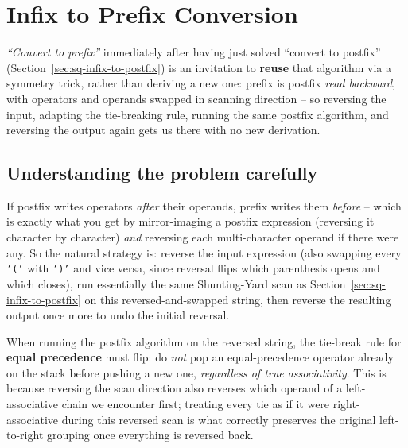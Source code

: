 \section{Infix to Prefix Conversion}
\label{sec:sq-infix-to-prefix}


\begin{patternbox}
\emph{``Convert to prefix''} immediately after having just solved
``convert to postfix'' (Section~\ref{sec:sq-infix-to-postfix}) is an
invitation to \textbf{reuse} that algorithm via a symmetry trick, rather
than deriving a new one: prefix is postfix \emph{read backward}, with
operators and operands swapped in scanning direction -- so reversing the
input, adapting the tie-breaking rule, running the same postfix algorithm,
and reversing the output again gets us there with no new derivation.
\end{patternbox}

\subsection*{Understanding the problem carefully}

If postfix writes operators \emph{after} their operands, prefix writes
them \emph{before} -- which is exactly what you get by mirror-imaging a
postfix expression (reversing it character by character) \emph{and}
reversing each multi-character operand if there were any. So the natural
strategy is: reverse the input expression (also swapping every
\texttt{'('} with \texttt{')'} and vice versa, since reversal flips which
parenthesis opens and which closes), run essentially the same
Shunting-Yard scan as Section~\ref{sec:sq-infix-to-postfix} on this
reversed-and-swapped string, then reverse the resulting output once more
to undo the initial reversal.

\begin{ideabox}
When running the postfix algorithm on the reversed string, the tie-break
rule for \textbf{equal precedence} must flip: do \emph{not} pop an
equal-precedence operator already on the stack before pushing a new one,
\emph{regardless of true associativity}. This is because reversing the
scan direction also reverses which operand of a left-associative chain we
encounter first; treating every tie as if it were right-associative during
this reversed scan is what correctly preserves the original
left-to-right grouping once everything is reversed back.
\end{ideabox}

